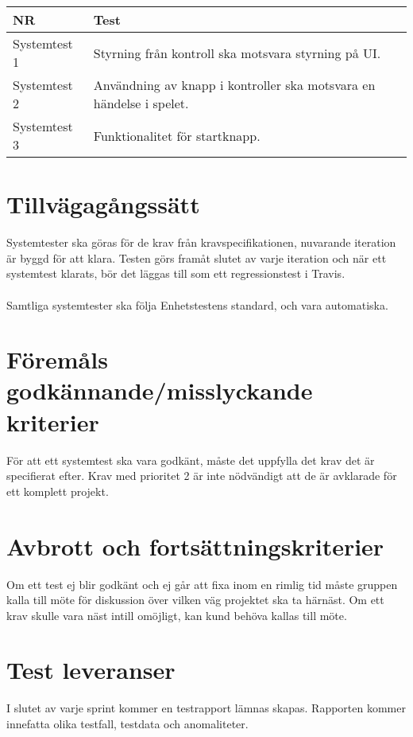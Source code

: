   \noindent
	\begin{tabular}{| p{2.1cm}| p{8cm}|}
	
      \hline
      NR&Test\\
      \hline
    
		Systemtest 1&Styrning från kontroll ska motsvara styrning på UI.\\
		\hline
		Systemtest 2&Användning av knapp i kontroller ska motsvara en händelse i spelet.\\
		\hline
		Systemtest 3&Funktionalitet för startknapp.\\
		\hline



   
  \end{tabular}
	
	


\section{Tillvägagångssätt}
	Systemtester ska göras för de krav från kravspecifikationen, nuvarande iteration är byggd för att klara. Testen görs framåt slutet av varje iteration och när ett systemtest klarats, bör det läggas till som ett regressionstest i Travis.\\
	\\
	Samtliga systemtester ska följa Enhetstestens standard, och vara automatiska. 		
	
	
	

\section{Föremåls godkännande/misslyckande kriterier}
	För att ett systemtest ska vara godkänt, måste det uppfylla det krav det är specifierat efter. Krav med prioritet 2 är inte nödvändigt att de är avklarade för ett komplett projekt.\\


\section{Avbrott och fortsättningskriterier}
	Om ett test ej blir godkänt och ej går att fixa inom en rimlig tid måste gruppen kalla till möte för diskussion över vilken väg projektet ska ta härnäst. Om ett krav skulle vara näst intill omöjligt, kan kund behöva kallas till möte.
	



\section{Test leveranser}
	I slutet av varje sprint kommer en testrapport lämnas skapas. Rapporten kommer innefatta olika testfall, testdata och anomaliteter.




